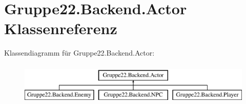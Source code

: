 \hypertarget{class_gruppe22_1_1_backend_1_1_actor}{\section{Gruppe22.\-Backend.\-Actor Klassenreferenz}
\label{class_gruppe22_1_1_backend_1_1_actor}
}
Klassendiagramm für Gruppe22.\-Backend.\-Actor\-:\begin{figure}[H]
\begin{center}
\leavevmode
\includegraphics[height=2.000000cm]{class_gruppe22_1_1_backend_1_1_actor}
\end{center}
\end{figure}
